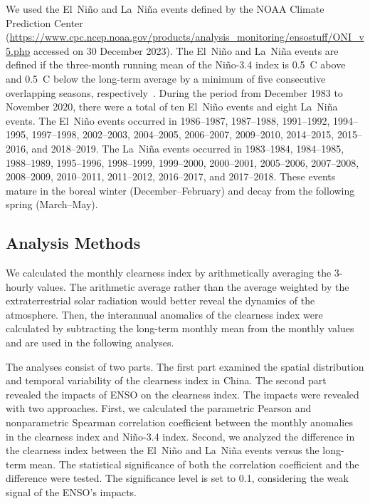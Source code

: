 \documentclass[atmosphere,article,accept,pdftex,moreauthors]{Definitions/mdpi}
\begin{document}
We used the El~Niño and La~Niña events defined by the NOAA Climate Prediction Center (\url{https://www.cpc.ncep.noaa.gov/products/analysis_monitoring/ensostuff/ONI_v5.php} accessed on 30 December 2023). The El~Niño and La~Niña events are defined if the three-month running mean of the Niño-3.4 index is 0.5~\textdegree{}C above and \textminus{}0.5~\textdegree{}C below the long-term average by a minimum of five consecutive overlapping seasons, respectively~\cite{kousky2007WF}. During the period from December 1983 to November 2020, there were a total of ten El~Niño events and eight La~Niña events. The El~Niño events occurred in 1986--1987, 1987--1988, 1991--1992, 1994--1995, 1997--1998, 2002--2003, 2004--2005, 2006--2007, 2009--2010, 2014--2015, 2015--2016, and 2018--2019. The La~Niña events occurred in 1983--1984, 1984--1985, 1988--1989, 1995--1996, 1998--1999, 1999--2000, 2000--2001, 2005--2006, 2007--2008, 2008--2009, 2010--2011, 2011--2012, 2016--2017, and 2017--2018. These events mature in the boreal winter (December--February) and decay from the following spring (March--May).

\subsection{Analysis Methods}\label{sec:stats}

We calculated the monthly clearness index by arithmetically averaging the 3-hourly values. The arithmetic average rather than the average weighted by the extraterrestrial solar radiation would better reveal the dynamics of the atmosphere. Then, the interannual anomalies of the clearness index were calculated by subtracting the long-term monthly mean from the monthly values and are used in the following analyses.

The analyses consist of two parts. The first part examined the spatial distribution and temporal variability of the clearness index in China. The second part revealed the impacts of ENSO on the clearness index. The impacts were revealed with two approaches. First, we calculated the parametric Pearson and nonparametric Spearman correlation coefficient between the monthly anomalies in the clearness index and Niño-3.4 index. Second, we analyzed the difference in the clearness index between the El~Niño and La~Niña events versus the long-term mean. The statistical significance of both the correlation coefficient and the difference were tested. The significance level is set to 0.1, considering the weak signal of the ENSO's impacts.
\end{document}
